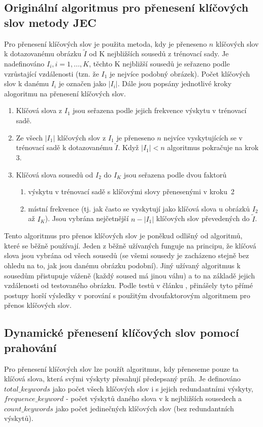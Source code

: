 \documentclass[czech,BP]{thesiskiv}
\begin{document}
\subsection{Originální algoritmus pro přenesení klíčových slov metody JEC}
\par Pro přenesení klíčových slov je použita metoda, kdy je přeneseno $n$ klíčových slov k dotazovanému obrázku $\tilde{I}$ od K nejbližších sousedů z trénovací sady. Je nadefinováno $I_{i}, i = 1, ..., K$, těchto K nejbližší sousedů je seřazeno podle vzrůstající vzdálenosti (tzn. že $I_{1} $ je nejvíce podobný obrázek). Počet klíčových slov k danému $I_{i}$ je označen jako $|I_{i}|$. Dále jsou popsány jednotlivé kroky alogoritmu na přenesení klíčových slov.
\begin{enumerate}
	\item Klíčová slova z $I_{1}$ jsou seřazena podle jejich frekvence výskytu v trénovací sadě.
	\item Ze všech $|I_{1}|$ klíčových slov z $I_{1}$ je přeneseno $n$ nejvíce vyskytujících se v trénovací sadě k dotazovanému $\tilde{I}$. Když $|I_{1}| < n$ algoritmus pokračuje na krok 3. 
	\item Klíčová slova sousedů od $I_{2}$ do $I_{K}$ jsou seřazena podle dvou faktorů
	\begin{enumerate}
		\item výskytu v trénovací sadě s klíčovými slovy přenesenými v kroku~2
		\item místní frekvence (tj. jak často se vyskytují jako klíčová slova u obrázků $I_{2}$ až $I_{K}$). Jsou vybrána nejčetnější $n-|I_{1}|$ klíčových slov převedených do $\tilde{I}$.
	\end{enumerate}
\end{enumerate}

\par Tento algoritmus pro přenos klíčových slov je poněkud odlišný od algoritmů, které se běžně používají. Jeden z běžně užívaných funguje na principu, že klíčová slova jsou vybrána od všech sousedů (se všemi sousedy je zacházeno stejně bez ohledu na to, jak jsou danému obrázku podobní). Jiný užívaný algoritmus k sousedům přistupuje váženě (každý soused má jinou váhu) a to na základě jejich vzdálenosti od testovaného obrázku. Podle testů v článku \citep{JEC}, přinášely tyto přímé postupy horší výsledky v porování s použitým dvoufaktorovým algoritmem pro přenos klíčových slov. \\
 
\subsection{Dynamické přenesení klíčových slov pomocí prahování}
\par Pro přenesení klíčových slov lze použít algoritmus, kdy přeneseme pouze ta klíčová slova, která svými výskyty přesahují předepsaný práh. Je definováno $total\_keywords$ jako počet všech klíčových slov i s jejich redundantními výskyty, $frequence\_keyword$ - počet výskytů daného slova v k nejbližších sousedech a $count\_keywords$ jako počet jedinečných klíčových slov (bez redundantních výskytů).  
\end{document}
